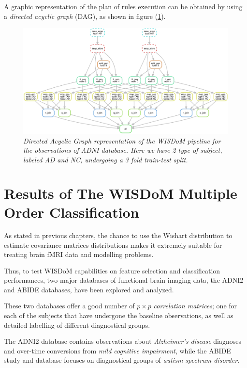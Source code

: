 \documentclass[12pt,openright,twoside,a4paper]{book}
\begin{document}
A graphic representation of the plan of rules execution can be obtained by using a \textit{directed acyclic graph} (DAG), as shown in figure (\ref{dag}).

\begin{figure}[!h]
\centering
\includegraphics[scale=0.53, angle=270]{dag}
\caption{\textit{Directed Acyclic Graph representation of the WISDoM pipeline for the observations of ADNI database. Here we have 2 type of subject, labeled AD and NC, undergoing a 3 fold train-test split.}}
\label{dag}
\end{figure}


\chapter{Results of The WISDoM Multiple Order Classification}

As stated in previous chapters, the chance to use the Wishart distribution to estimate covariance matrices distributions makes it extremely suitable for treating brain fMRI data and modelling problems.

Thus, to test WISDoM capabilities on feature selection and classification performances, two major databases of functional brain imaging data, the ADNI2 and ABIDE databases, have been explored and analyzed.

These two databases offer a good number of $p\times p$ \textit{correlation matrices}; one for each of the subjects that have undergone the baseline observations, as well as detailed labelling of different diagnostical groups.

The ADNI2 database contains observations about \textit{Alzheimer's disease} diagnoses and over-time conversions from \textit{mild cognitive impairment}, while the ABIDE study and database focuses on diagnostical groups of \textit{autism spectrum disorder}.
\vspace{5mm}
\end{document}
